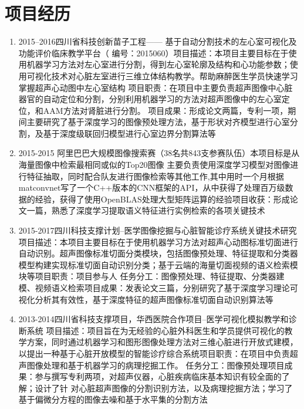 \section*{项目经历}
\begin{enumerate}
\item {2015–2016}{四川省科技创新苗子工程—— 基于自动分割技术的左心室可视化及功能评价临床教学平台}{\textnormal{（ 编号：2015060）}}{\newline 项目描述：本项目主要目标在于使用机器学习方法对左心室进行分割，得到左心室轮廓及结构和心功能参数；使用可视化技术对心脏左室进行三维立体结构教学。帮助麻醉医生学员快速学习掌握超声心动图中左心室结构}{ \newline 项目职责：在项目中主要负责超声图像中心脏器官的自动定位和分割，分别利用机器学习的方法对超声图像中的左心室定位，和AAM方法对肾脏进行分割。 \newline 项目成果：形成论文两篇，专利一项，期间主要研究了基于深度学习的图像预处理方法，基于形状对齐模型进行心室分割，及基于深度级联回归模型进行心室边界分割算法等}{}  

\item{2015-2015}{ 阿里巴巴大规模图像搜索赛（38名共843支参赛队伍）}{\textnormal{\newline 本项目标是从海量图像中检索最相同或似的Top20图像 }}{ \newline 主要负责使用深度学习模型对图像进行特征抽取，同时配合队友进行图像检索等其他工作,其中用时一个月根据matconvnet写了一个C++版本的CNN框架的API，从中获得了处理百万级数据的经验，获得了使用OpenBLAS处理大型矩阵运算的经验}{\newline 项目收获：形成论文一篇，熟悉了深度学习提取语义特征进行实例检索的各项关键技术}{}

\item{2015-2017}{四川科技支撑计划--医学图像挖掘与心脏智能诊疗系统关键技术研究}{\textnormal{ \newline 项目描述：本项目主要目标在于使用机器学习方法对超声心动图标准切面进行自动识别。超声图像标准切面分类模块，包括图像预处理、特征提取和分类器模型构建实现标准切面自动识别分类；基于云端的海量切面视频的语义检索模块等}}{\newline 项目职责：项目参与人 \newline 任务分工：图像预处理、特征提取、分类器建模、视频语义检索}{\newline 项目成果：发表论文三篇，分别研究了基于深度学习理论可视化分析其有效性，基于深度特征的超声图像标准切面自动识别算法等}{}

\item{2013-2014}{四川省科技支撑项目，华西医院合作项目–医学可视化模拟教学和诊断系统}{\textnormal{ \newline 项目描述：项目旨在为无经验的心脏外科医生和学员提供可视化的教学方案，同时通过机器学习和图形图像处理方法对三维心脏进行开放式建模，以提出一种基于心脏开放模型的智能诊疗综合系统}}{\newline 项目职责：在项目中负责超声图像处理和基于机器学习的病理挖掘工作。 \newline 任务分工：图像预处理}{\newline 项目成果：参与撰写专利两项，对超声仪器，心脏疾病临床基本知识有较全面的了解；设计了针
对心脏超声图像的分割识别方法，以及病理挖掘方法；学习了基于偏微分方程的图像去噪和基于水平集的分割方法}{}
\end{enumerate}
